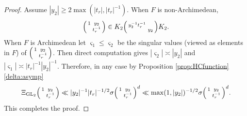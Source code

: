\documentclass[12pt]{amsart}
\theoremstyle{remark}
\numberwithin{equation}{section}
\newcommand{\GL}{\mathrm{GL}}
\newcommand{\quash}[1]{}
\theoremstyle{definition}
\newenvironment{psmatrix}
  {\left(\begin{smallmatrix}}
  {\end{smallmatrix}\right)}
\numberwithin{equation}{subsection}
\newcommand{\norm}[1]{\lVert#1\rVert}
\begin{document}
\begin{proof}
Assume $|y_2|\geq 2\max(|t_r|,|t_r|^{-1}).$  When $F$ is non-Archimedean,
\begin{align*}
    \begin{psmatrix}
        1 & y_2\\
          & t_r^{-1}
    \end{psmatrix}\in K_{2}\begin{psmatrix}
         y_2^{-1}t_r^{-1}& \\
         & y_2
    \end{psmatrix}K_2.
\end{align*}
When $F$ is Archimedean let $\varsigma_1\le \varsigma_2$ be the singular values (viewed as elements in $F$) of $ \begin{psmatrix}
        1 & y_2\\
          & t_r^{-1}
    \end{psmatrix}$. Then direct computation gives $|\varsigma_2|\asymp |y_2|$ and $|\varsigma_1|\asymp |t_r|^{-1}|y_2|^{-1}$.
Therefore, in any case by Proposition \ref{prop:HCfunction}\ref{delta:asymp} 
\begin{align*}
    \Xi_{\GL_2}\begin{psmatrix}
        1 & y_2\\
          & t_{r}^{-1}
    \end{psmatrix}\ll |y_2|^{-1}|t_r|^{-1/2}\sigma\begin{psmatrix}
        1 & y_2\\
          & t_{r}^{-1}
    \end{psmatrix}^d\ll \max(1,|y_2|)^{-1/2}\sigma\begin{psmatrix}
        1 & y_2\\
          & t_{r}^{-1}
    \end{psmatrix}^d.
\end{align*}
This completes the proof.
\end{proof}
\quash{
Let $d'>0.$  By \eqref{If:bound} and the Iwasawa decomposition we have
\begin{align}
\norm{I_f(x)\sigma^{d'}_{X^\circ_{\ell}}}_2 \leq \nu_{2d'}(f)^2\int_{N(F) \backslash \GL_r(F) \times F^\times }\frac{\sigma_{X_\ell^\circ}^{d'}(\begin{psmatrix}g_1 & \\ & g_2 \end{psmatrix},a'm_\ell)\Xi^2(g_1)\Xi^2(g_2)}{(\sigma(g_1)\sigma(a')\sigma(g_1))^{2d}}dg_1dg_2d^\times a
\end{align}
By \eqref{lem:products} and Proposition \ref{prop:HCfunction}\ref{convergence} the integral converges for $d'$ sufficiently large.  Thus $\norm{I_f(x)\sigma^{d'}_{X^\circ_{\ell}}}_2 \ll \nu_{2d'}(f)^2.$  Since $\mathcal{C}(\GL_{r,r-2}(F))$ is a smooth $\GL_{r,r-2}(F)$-module we we can now apply Lemma \ref{lem:equiv:nA} and Lemma \ref{lem:equiv:A} to deduce that $I_f \in \mathcal{C}(X_\ell^{\circ}(F),\mathcal{H})$ and that the map $I_{(\cdot)}$ is continuous.}
\end{document}

